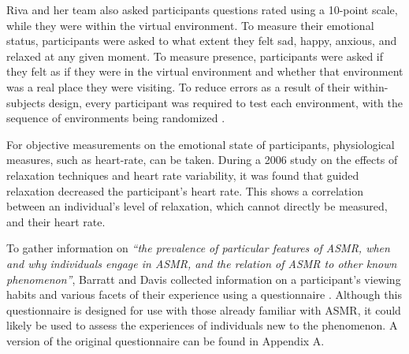 \documentclass{sigchi}
\newcommand{\inlinequote}[1]{\textit{``#1''}}
\begin{document}
Riva and her team also asked participants questions rated using a 10-point scale, while they were within the virtual environment. To measure their emotional status, participants were asked to what extent they felt sad, happy, anxious, and relaxed at any given moment. To measure presence, participants were asked if they felt as if they were in the virtual environment and whether that environment was a real place they were visiting.
To reduce errors as a result of their within-subjects design, every participant was required to test each environment, with the sequence of environments being randomized \cite{riva2007affective}.

For objective measurements on the emotional state of participants, physiological measures, such as heart-rate, can be taken. During a 2006 study on the effects of relaxation techniques and heart rate variability, it was found that guided relaxation decreased the participant's heart rate\cite{sarang2006effects}. This shows a correlation between an individual's level of relaxation, which cannot directly be measured, and their heart rate.

To gather information on \inlinequote{the prevalence of particular features of ASMR, when and why individuals engage in ASMR, and the relation of ASMR to other known phenomenon}, Barratt and Davis collected information on a participant's viewing habits and various facets of their experience using a questionnaire \cite{barratt2015autonomous}. Although this questionnaire is designed for use with those already familiar with ASMR, it could likely be used to assess the experiences of individuals new to the phenomenon. A version of the original questionnaire can be found in Appendix A. 


\end{document}

